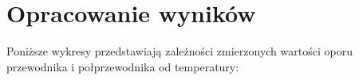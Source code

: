 \documentclass[10pt,a4paper]{article}
\newcommand{\forceindent}{\leavevmode{\parindent=3em\indent}}
\begin{document}


\newpage
\section{Opracowanie wyników}

\forceindent Poniższe wykresy przedstawiają zależności zmierzonych wartości oporu przewodnika i połprzewodnika od temperatury:  
\end{document}
